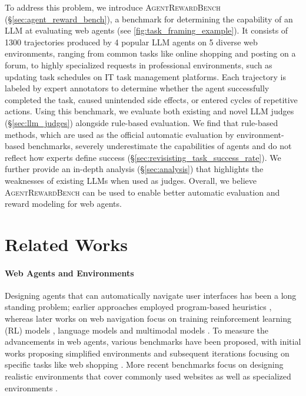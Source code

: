\documentclass{article} %
\newcommand{\arb}{\textsc{AgentRewardBench}}
\begin{document}
To address this problem, we introduce \arb{} (\S\ref{sec:agent_reward_bench}), a benchmark for determining the capability of an LLM at evaluating web agents (see \cref{fig:task_framing_example}). It consists of 1300 trajectories produced by 4 popular LLM agents on 5 diverse web environments, ranging from common tasks like online shopping and posting on a forum, to highly specialized requests in professional environments, such as updating task schedules on IT task management platforms. Each trajectory is labeled by expert annotators to determine whether the agent successfully completed the task, caused unintended side effects, or entered cycles of repetitive actions. Using this benchmark, we evaluate both existing and novel LLM judges (\S\ref{sec:llm_judges}) alongside rule-based evaluation. We find that rule-based methods, which are used as the official automatic evaluation by environment-based benchmarks, severely underestimate the capabilities of agents and do not reflect how experts define success (\S\ref{sec:revisisting_task_success_rate}). We further provide an in-depth analysis (\S\ref{sec:analysis}) that highlights the weaknesses of existing LLMs when used as judges. 
Overall, we believe \arb{} can be used to enable better automatic evaluation and reward modeling for web agents.

\section{Related Works}

\paragraph{Web Agents and Environments}
Designing agents that can automatically navigate user interfaces has been a long standing problem; earlier approaches employed program-based heuristics \citep{ibot_2000}, whereas later works on web navigation focus on training reinforcement learning (RL) models \citep{gur2018learning,humphreys2022datadrivenapproachlearningcontrol}, language models \citep{nakano2021webgpt,gur2023real,deng2023mind2web} and multimodal models \citep{pix2act_shaw_2023,lu2024weblinx,zheng2024gpt4visiongeneralistwebagent}.
To measure the advancements in web agents, various benchmarks have been proposed, with initial works proposing simplified environments \citep{shi2017world,Liu_Guu_Pasupat_Shi_Liang_2018} and subsequent iterations focusing on specific tasks like web shopping \citep{Yao_Chen_Yang_Narasimhan_2023}. More recent benchmarks focus on designing realistic environments that cover commonly used websites \citep{zhou_webarena_2024,koh_visualwebarena_2024} as well as specialized environments \citep{workarena_l1,workarena_l2}.
\end{document}
